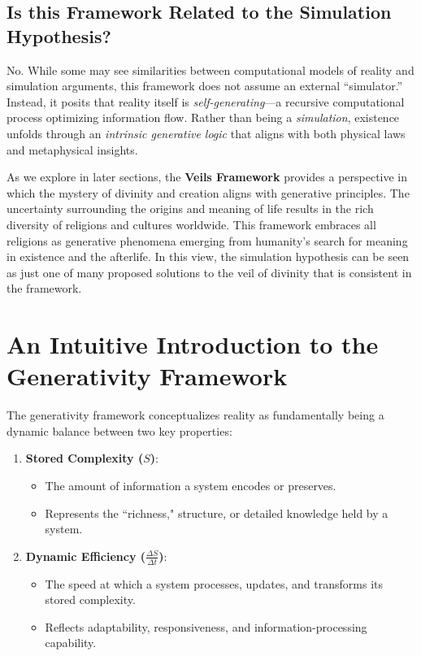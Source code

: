 \documentclass[12pt]{article}
\begin{document}
\subsection{Is this Framework Related to the Simulation Hypothesis?}

No. While some may see similarities between computational models of reality and simulation arguments, this framework does not assume an external “simulator.” Instead, it posits that reality itself is \textit{self-generating}—a recursive computational process optimizing information flow. Rather than being a \textit{simulation}, existence unfolds through an \textit{intrinsic generative logic} that aligns with both physical laws and metaphysical insights.

As we explore in later sections, the \textbf{Veils Framework} provides a perspective in which the mystery of divinity and creation aligns with generative principles. The uncertainty surrounding the origins and meaning of life results in the rich diversity of religions and cultures worldwide. This framework embraces all religions as generative phenomena emerging from humanity's search for meaning in existence and the afterlife. In this view, the simulation hypothesis can be seen as just one of many proposed solutions to the veil of divinity that is consistent in the framework.


\section{An Intuitive Introduction to the Generativity Framework}
The generativity framework conceptualizes reality as fundamentally being a dynamic balance between two key properties:

\begin{enumerate}
    \item \textbf{Stored Complexity (\( S \))}:  
    \begin{itemize}
        \item The amount of information a system encodes or preserves.
        \item Represents the ``richness," structure, or detailed knowledge held by a system.
    \end{itemize}

    \item \textbf{Dynamic Efficiency (\( \frac{\Delta S}{\Delta t} \))}:  
    \begin{itemize}
        \item The speed at which a system processes, updates, and transforms its stored complexity.
        \item Reflects adaptability, responsiveness, and information-processing capability.
    \end{itemize}
\end{enumerate}
\end{document}
